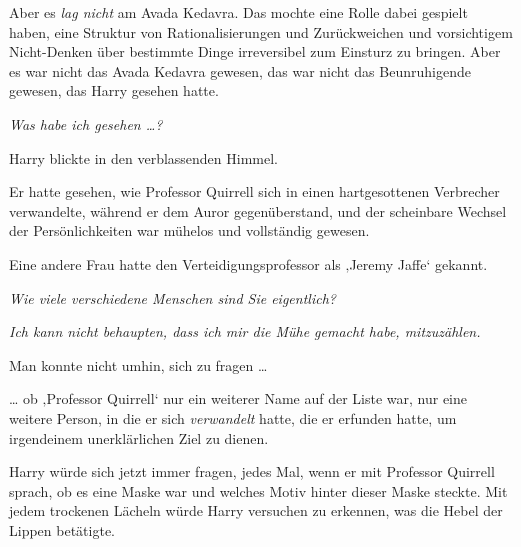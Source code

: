 Aber es \emph{lag nicht} am Avada Kedavra. Das mochte eine Rolle dabei gespielt haben, eine Struktur von Rationalisierungen und Zurückweichen und vorsichtigem Nicht-Denken über bestimmte Dinge irreversibel zum Einsturz zu bringen. Aber es war nicht das Avada Kedavra gewesen, das war nicht das Beunruhigende gewesen, das Harry gesehen hatte.

\emph{Was habe ich gesehen …?}

Harry blickte in den verblassenden Himmel.

Er hatte gesehen, wie Professor Quirrell sich in einen hartgesottenen Verbrecher verwandelte, während er dem Auror gegenüberstand, und der scheinbare Wechsel der Persönlichkeiten war mühelos und vollständig gewesen.

Eine andere Frau hatte den Verteidigungsprofessor als ‚Jeremy Jaffe‘ gekannt.

\emph{Wie viele verschiedene Menschen sind Sie eigentlich?}

\emph{Ich kann nicht behaupten, dass ich mir die Mühe gemacht habe, mitzuzählen.}

Man konnte nicht umhin, sich zu fragen …

… ob ‚Professor Quirrell‘ nur ein weiterer Name auf der Liste war, nur eine weitere Person, in die er sich \emph{verwandelt} hatte, die er erfunden hatte, um irgendeinem unerklärlichen Ziel zu dienen.

Harry würde sich jetzt immer fragen, jedes Mal, wenn er mit Professor Quirrell sprach, ob es eine Maske war und welches Motiv hinter dieser Maske steckte. Mit jedem trockenen Lächeln würde Harry versuchen zu erkennen, was die Hebel der Lippen betätigte.

